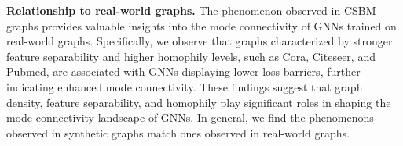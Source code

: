 


\noindent\textbf{Relationship to real-world graphs.} The phenomenon observed in CSBM graphs provides valuable insights into the mode connectivity of GNNs trained on real-world graphs. Specifically, we observe that graphs characterized by stronger feature separability and higher homophily levels, such as Cora, Citeseer, and Pubmed, are associated with GNNs displaying lower loss barriers, further indicating enhanced mode connectivity. These findings suggest that graph density, feature separability, and homophily play significant roles in shaping the mode connectivity landscape of GNNs. In general, we find the phenomenons observed in synthetic graphs match ones observed in real-world graphs.



